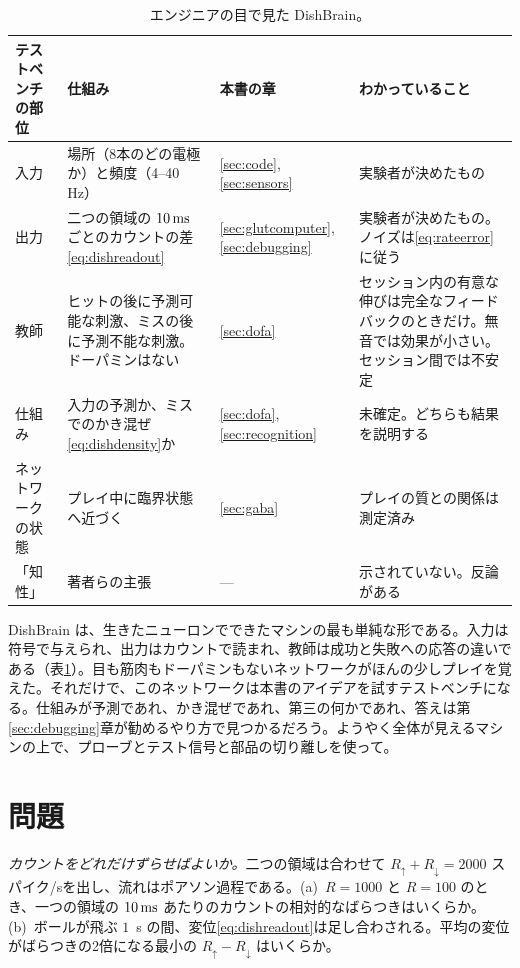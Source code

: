 \begin{table}[t]
\centering
\footnotesize
\setlength{\tabcolsep}{4pt}
\renewcommand{\arraystretch}{1.15}
\begin{tabular}{>{\raggedright}p{2.1cm}>{\raggedright}p{4.2cm}>{\raggedright}p{1.9cm}>{\raggedright\arraybackslash}p{4.6cm}}
\toprule
テストベンチの部位 & 仕組み & 本書の章 & わかっていること \\
\midrule
入力 & 場所（8本のどの電極か）と頻度（4--40 Hz） & \ref{sec:code}, \ref{sec:sensors} & 実験者が決めたもの \\
出力 & 二つの領域の $10\,\text{ms}$ ごとのカウントの差\eqref{eq:dishreadout} & \ref{sec:glutcomputer}, \ref{sec:debugging} & 実験者が決めたもの。ノイズは\eqref{eq:rateerror}に従う \\
教師 & ヒットの後に予測可能な刺激、ミスの後に予測不能な刺激。ドーパミンはない & \ref{sec:dofa} & セッション内の有意な伸びは完全なフィードバックのときだけ。無音では効果が小さい。セッション間では不安定 \\
仕組み & 入力の予測か、ミスでのかき混ぜ\eqref{eq:dishdensity}か & \ref{sec:dofa}, \ref{sec:recognition} & 未確定。どちらも結果を説明する \\
ネットワークの状態 & プレイ中に臨界状態へ近づく & \ref{sec:gaba} & プレイの質との関係は測定済み \\
「知性」 & 著者らの主張 & --- & 示されていない。反論がある \\
\bottomrule
\end{tabular}
\caption{エンジニアの目で見た DishBrain。}
\label{tab:dishbrain}
\end{table}

DishBrain は、生きたニューロンでできたマシンの最も単純な形である。入力は符号で与えられ、出力はカウントで読まれ、教師は成功と失敗への応答の違いである（表\ref{tab:dishbrain}）。目も筋肉もドーパミンもないネットワークがほんの少しプレイを覚えた。それだけで、このネットワークは本書のアイデアを試すテストベンチになる。仕組みが予測であれ、かき混ぜであれ、第三の何かであれ、答えは第\ref{sec:debugging}章が勧めるやり方で見つかるだろう。ようやく全体が見えるマシンの上で、プローブとテスト信号と部品の切り離しを使って。

\section{問題}

\begin{exercise}[\lvlA]
\label{ex:22:1}
\emph{カウントをどれだけずらせばよいか。}二つの領域は合わせて $R_\uparrow+R_\downarrow=2000$ スパイク/sを出し、流れはポアソン過程である。(a)~$R=1000$ と $R=100$ のとき、一つの領域の $10\,\text{ms}$ あたりのカウントの相対的なばらつきはいくらか。(b)~ボールが飛ぶ $1$~s の間、変位\eqref{eq:dishreadout}は足し合わされる。平均の変位がばらつきの2倍になる最小の $R_\uparrow-R_\downarrow$ はいくらか。
\end{exercise}

